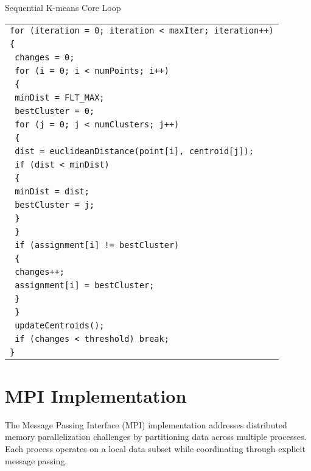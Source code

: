 \documentclass[10pt,a4paper,twocolumn]{article}
\makeatletter
\newcounter{alglineno}
\newenvironment{algtabular}{%
\setcounter{alglineno}{0}%
\begin{tabular}{@{\stepcounter{alglineno}\makebox[1.2em][r]{\tiny\thealglineno:}\hspace{0.2em}}l@{}}%
}{%
\end{tabular}%
}
\makeatother
\begin{document}
\begin{algorithm}[H]
\caption{Sequential K-means Core Loop}
\label{alg:sequential}
\begin{algtabular}
\texttt{for (iteration = 0; iteration < maxIter; iteration++)} \\
\texttt{\{} \\
\texttt{  changes = 0;} \\
\texttt{  for (i = 0; i < numPoints; i++)} \\
\texttt{  \{} \\
\texttt{    minDist = FLT\_MAX;} \\
\texttt{    bestCluster = 0;} \\
\texttt{    for (j = 0; j < numClusters; j++)} \\
\texttt{    \{} \\
\texttt{      dist = euclideanDistance(point[i], centroid[j]);} \\
\texttt{      if (dist < minDist)} \\
\texttt{      \{} \\
\texttt{        minDist = dist;} \\
\texttt{        bestCluster = j;} \\
\texttt{      \}} \\
\texttt{    \}} \\
\texttt{    if (assignment[i] != bestCluster)} \\
\texttt{    \{} \\
\texttt{      changes++;} \\
\texttt{      assignment[i] = bestCluster;} \\
\texttt{    \}} \\
\texttt{  \}} \\
\texttt{  updateCentroids();} \\
\texttt{  if (changes < threshold) break;} \\
\texttt{\}} \\
\end{algtabular}
\end{algorithm}

\section{MPI Implementation}

The Message Passing Interface (MPI) implementation addresses distributed memory parallelization challenges by partitioning data across multiple processes. Each process operates on a local data subset while coordinating through explicit message passing.
\end{document}
